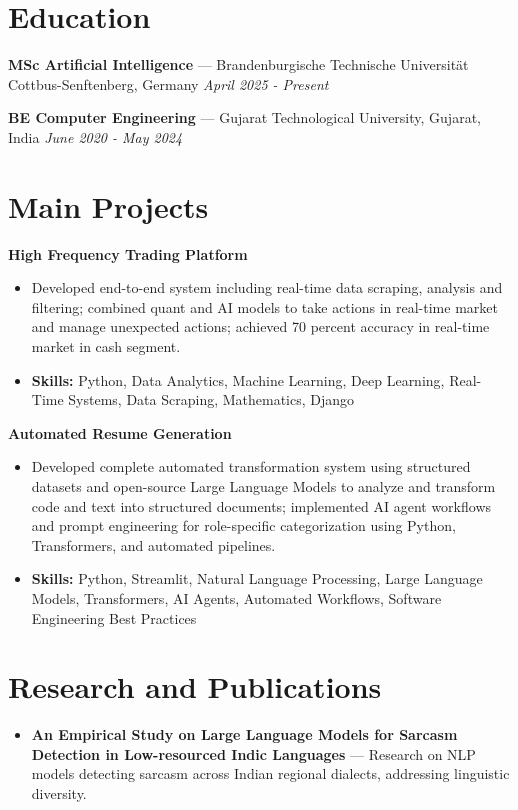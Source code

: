 \documentclass[a4paper,10pt]{article}
\begin{document}
\section*{Education}
\textbf{MSc Artificial Intelligence} — Brandenburgische Technische Universität Cottbus-Senftenberg, Germany \hfill \textit{April 2025 - Present}\par
\vspace{1.5pt}
\textbf{BE Computer Engineering} — Gujarat Technological University, Gujarat, India \hfill \textit{June 2020 - May 2024}\par

\section*{Main Projects}
\textbf{High Frequency Trading Platform}\par
\vspace{1pt}
\begin{itemize}
  \item Developed end-to-end system including real-time data scraping, analysis and filtering; combined quant and AI models to take actions in real-time market and manage unexpected actions; achieved 70 percent accuracy in real-time market in cash segment.
  \item \textbf{Skills:} Python, Data Analytics, Machine Learning, Deep Learning, Real-Time Systems, Data Scraping, Mathematics, Django
\end{itemize}
\vspace{3pt}
\textbf{Automated Resume Generation}\par
\vspace{1pt}
\begin{itemize}
  \item Developed complete automated transformation system using structured datasets and open-source Large Language Models to analyze and transform code and text into structured documents; implemented AI agent workflows and prompt engineering for role-specific categorization using Python, Transformers, and automated pipelines.
  \item \textbf{Skills:} Python, Streamlit, Natural Language Processing, Large Language Models, Transformers, AI Agents, Automated Workflows, Software Engineering Best Practices
\end{itemize}

\section*{Research and Publications}
\begin{itemize}
\item \textbf{An Empirical Study on Large Language Models for Sarcasm Detection in Low-resourced Indic Languages} — Research on NLP models detecting sarcasm across Indian regional dialects, addressing linguistic diversity.
\end{itemize}
\end{document}
